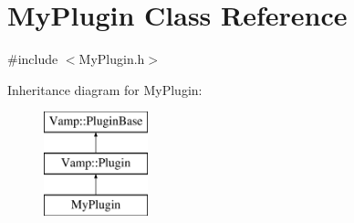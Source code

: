 \hypertarget{class_my_plugin}{}\section{My\+Plugin Class Reference}
\label{class_my_plugin}


{\ttfamily \#include $<$My\+Plugin.\+h$>$}

Inheritance diagram for My\+Plugin\+:\begin{figure}[H]
\begin{center}
\leavevmode
\includegraphics[height=3.000000cm]{class_my_plugin}
\end{center}
\end{figure}
